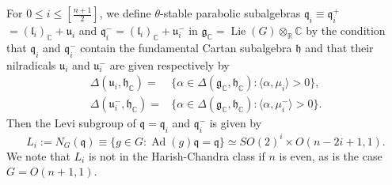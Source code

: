 \begin{definition}
\label{def:qi}
For $0 \le i \le [\frac {n+1} 2]$, 
 we define $\theta$-stable parabolic subalgebras 
$
{\mathfrak {q}}_i\equiv {\mathfrak {q}}_i^+
$
$
=({\mathfrak {l}}_i)_{\mathbb{C}} +{\mathfrak {u}}_i
$
and 
$
{\mathfrak {q}}_i^-
=({\mathfrak {l}}_i)_{\mathbb{C}} +{\mathfrak {u}}_i^-
$
 in ${\mathfrak {g}}_{\mathbb{C}}=\operatorname{Lie}(G) \otimes_{\mathbb{R}} {\mathbb{C}}$
by the condition
 that ${\mathfrak {q}}_i$ and ${\mathfrak {q}}_i^-$
 contain the fundamental Cartan subalgebra 
 ${\mathfrak {h}}$ 
 and that their nilradicals ${\mathfrak {u}}_i$ and ${\mathfrak {u}}_i^-$
 are given respectively
 by 
\begin{align*}
\Delta({\mathfrak {u}}_i, {\mathfrak {h}}_{\mathbb{C}})
=&\{\alpha \in \Delta({\mathfrak {g}}_{\mathbb{C}}, {\mathfrak {h}}_{\mathbb{C}}): \langle \alpha, \mu_i \rangle >0\}, 
\\
\Delta({\mathfrak {u}}_i^-, {\mathfrak {h}}_{\mathbb{C}})
=&\{\alpha \in \Delta({\mathfrak {g}}_{\mathbb{C}}, {\mathfrak {h}}_{\mathbb{C}}): \langle \alpha, \mu_i^- \rangle >0\}.  
\end{align*}
Then the Levi subgroup of 
 ${\mathfrak {q}}={\mathfrak {q}}_i$ and ${\mathfrak{q}}_i^-$
 is given by 
\begin{equation}
\label{eqn:Li}
  L_i := N_G({\mathfrak{q}})
      \equiv \{g \in G:{\operatorname{Ad}}(g){\mathfrak{q}}={\mathfrak{q}}\}
      \simeq SO(2)^i \times O(n-2i+1,1).  
\end{equation}
We note that $L_i$ is not in the Harish-Chandra class
 if $n$ is even, 
 as is the case $G=O(n+1,1)$.  
\end{definition}

